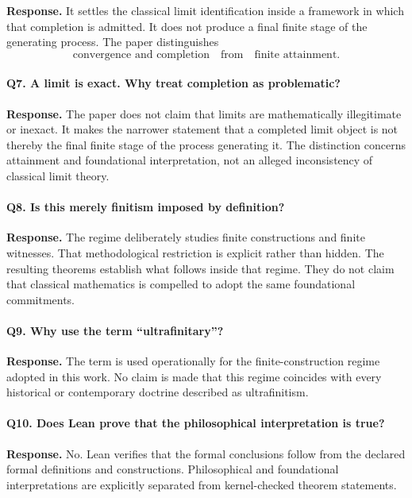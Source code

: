 \documentclass[11pt,a4paper]{article}
\begin{document}
\textbf{Response.}
It settles the classical limit identification inside a framework in
which that completion is admitted. It does not produce a final finite
stage of the generating process. The paper distinguishes
\[
\text{convergence and completion}
\quad\text{from}\quad
\text{finite attainment}.
\]

\paragraph{Q7. A limit is exact. Why treat completion as problematic?}

\textbf{Response.}
The paper does not claim that limits are mathematically illegitimate or
inexact. It makes the narrower statement that a completed limit object
is not thereby the final finite stage of the process generating it.
The distinction concerns attainment and foundational interpretation,
not an alleged inconsistency of classical limit theory.

\paragraph{Q8. Is this merely finitism imposed by definition?}

\textbf{Response.}
The regime deliberately studies finite constructions and finite
witnesses. That methodological restriction is explicit rather than
hidden. The resulting theorems establish what follows inside that
regime. They do not claim that classical mathematics is compelled to
adopt the same foundational commitments.

\paragraph{Q9. Why use the term ``ultrafinitary''?}

\textbf{Response.}
The term is used operationally for the finite-construction regime
adopted in this work. No claim is made that this regime coincides with
every historical or contemporary doctrine described as
ultrafinitism.

\paragraph{Q10. Does Lean prove that the philosophical interpretation is true?}

\textbf{Response.}
No. Lean verifies that the formal conclusions follow from the declared
formal definitions and constructions. Philosophical and foundational
interpretations are explicitly separated from kernel-checked theorem
statements.
\end{document}
